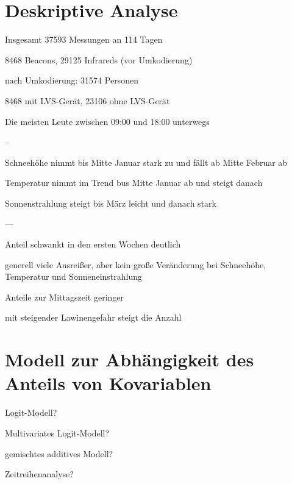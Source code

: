 \documentclass[11pt,a4paper]{report}
\begin{document}
\chapter{Deskriptive Analyse}
Insgesamt 37593 Messungen an 114 Tagen

8468 Beacons, 29125 Infrareds (vor Umkodierung)

nach Umkodierung: 31574 Personen

8468 mit LVS-Gerät, 23106 ohne LVS-Gerät

Die meisten Leute zwischen 09:00 und 18:00 unterwegs

--

Schneehöhe nimmt bis Mitte Januar stark zu und fällt ab Mitte Februar ab

Temperatur nimmt im Trend bus Mitte Januar ab und steigt danach
 
Sonnenstrahlung steigt bis März leicht und danach stark


---


Anteil schwankt in den ersten Wochen deutlich

generell viele Ausreißer, aber kein große Veränderung bei Schneehöhe, Temperatur und Sonneneinstrahlung

Anteile zur Mittagszeit geringer

mit steigender Lawinengefahr steigt die Anzahl

\chapter{Modell zur Abhängigkeit des Anteils von Kovariablen}

Logit-Modell?

Multivariates Logit-Modell?

gemischtes additives Modell?

Zeitreihenanalyse?
	
	
\end{document}
